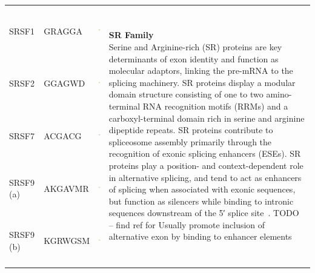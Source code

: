 \documentclass[a4paper,10pt]{article}
\begin{document}
\begin{center}
\begin{longtable}{|l|l|l|p{6cm}|}
\hline \hline
\endlastfoot
SRSF1  &  GRAGGA &
 \includegraphics[height=0.8in]{./seqLogo/SRSF1_gragga.pdf}
 & \multirow{6}{6cm}{
 \textbf{SR Family} \newline 
 Serine and Arginine-rich (SR) proteins are key determinants of exon identity and function 
 as molecular adaptors, linking the pre-mRNA to the splicing machinery. SR proteins display
 a modular domain structure consisting of one to two amino- terminal RNA recognition motifs (RRMs) and a carboxyl-terminal domain rich in serine and arginine dipeptide repeats.
 SR proteins contribute to spliceosome assembly primarily through the recognition of exonic splicing enhancers (ESEs).
  SR proteins play a position- and context-dependent role in alternative splicing, and tend to act as enhancers of splicing when associated with exonic sequences, but function as silencers while binding to intronic sequences 
  downstream of the 5′ splice site~\cite{Howard2015}.
TODO -- find ref for  Usually promote inclusion of alternative exon by binding to enhancer elements
} \\
\cline{1-3}
SRSF2 & GGAGWD &
 \includegraphics[height=0.8in]{./seqLogo/SRSF2_ggagwd.pdf}
 &  \\
 \cline{1-3}
SRSF7 & ACGACG &
 \includegraphics[height=0.8in]{./seqLogo/SRSF7_acgacg.pdf}
 &  \\
  \cline{1-3}
SRSF9 (a) & AKGAVMR &
 \includegraphics[height=0.8in]{./seqLogo/SRSF9_akgavmr.pdf}
 &  \\
   \cline{1-3}
SRSF9 (b)  &  KGRWGSM &
 \includegraphics[height=0.8in]{./seqLogo/SRSF9_kgrwgsm.pdf}

\end{longtable}
\end{center}
\end{document}
